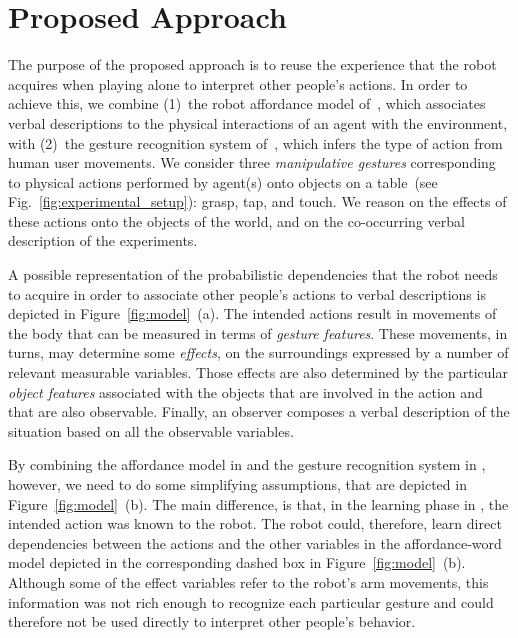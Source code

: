 \section{Proposed Approach}
The purpose of the proposed approach is to reuse the experience that the robot acquires when playing alone to interpret other people's actions.
In order to achieve this, we combine (1)~the robot affordance model of~\cite{salvi:2012:smcb}, which associates verbal descriptions to the physical interactions of an agent with the environment, with (2)~the gesture recognition system of~\cite{saponaro:2013:crhri}, which infers the type of action from human user movements.
We consider three \emph{manipulative gestures} corresponding to physical actions performed by agent(s) onto objects on a table~(see Fig.~\ref{fig:experimental_setup}): grasp, tap, and touch.
We reason on the effects of these actions onto the objects of the world, and on the co-occurring verbal description of the experiments.

A possible representation of the probabilistic dependencies that the robot needs to acquire in order to associate other people's actions to verbal descriptions is depicted in Figure~\ref{fig:model}~(a).
The intended actions result in movements of the body that can be measured in terms of \emph{gesture features}.
These movements, in turns, may determine some \emph{effects}, on the surroundings expressed by a number of relevant measurable variables.
Those effects are also determined by the particular \emph{object features} associated with the objects that are involved in the action and that are also observable.
Finally, an observer composes a verbal description of the situation based on all the observable variables.

By combining the affordance model in \cite{salvi:2012:smcb} and the gesture recognition system in \cite{saponaro:2013:crhri}, however, we need to do some simplifying assumptions, that are depicted in Figure~\ref{fig:model}~(b).
The main difference, is that, in the learning phase in \cite{salvi:2012:smcb}, the intended action was known to the robot.
The robot could, therefore, learn direct dependencies between the actions and the other variables in the affordance-word model depicted in the corresponding dashed box in Figure~\ref{fig:model}~(b).
Although some of the effect variables refer to the robot's arm movements, this information was not rich enough to recognize each particular gesture and could therefore not be used directly to interpret other people's behavior.

